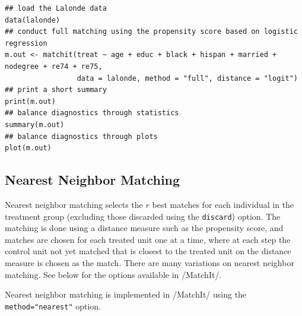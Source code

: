 \documentclass[oneside,letterpaper,titlepage]{article}
\begin{document}
\begin{verbatim}
## load the Lalonde data
data(lalonde)
## conduct full matching using the propensity score based on logistic regression
m.out <- matchit(treat ~ age + educ + black + hispan + married + nodegree + re74 + re75, 
                 data = lalonde, method = "full", distance = "logit")
## print a short summary
print(m.out)
## balance diagnostics through statistics
summary(m.out)
## balance diagnostics through plots
plot(m.out)
\end{verbatim}


\subsection{Nearest Neighbor Matching}
\label{nearest}

Nearest neighbor matching selects the $r$ best matches for each
individual in the treatment group (excluding those discarded using the
\texttt{discard}) option.  The matching is done using a distance
measure such as the propensity score, and matches are chosen for each
treated unit one at a time, where at each step the control unit not
yet matched that is closest to the treated unit on the distance
measure is chosen as the match.  There are many variations on nearest
neighbor matching.  See below for the options available in /MatchIt/.

Nearest neighbor matching is implemented in /MatchIt/ using the
\texttt{method="nearest"} option.
\end{document}
